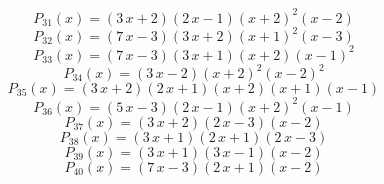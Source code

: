 \subitem \begin{dmath*}P_{31}(x) = {\left(3 \, x + 2\right)} {\left(2 \, x - 1\right)} {\left(x + 2\right)}^{2} {\left(x - 2\right)} \end{dmath*}\vspace{- 1.20000000000000 cm}
\subitem \begin{dmath*}P_{32}(x) = {\left(7 \, x - 3\right)} {\left(3 \, x + 2\right)} {\left(x + 1\right)}^{2} {\left(x - 3\right)} \end{dmath*}\vspace{- 1.20000000000000 cm}
\subitem \begin{dmath*}P_{33}(x) = {\left(7 \, x - 3\right)} {\left(3 \, x + 1\right)} {\left(x + 2\right)} {\left(x - 1\right)}^{2} \end{dmath*}\vspace{- 1.20000000000000 cm}
\subitem \begin{dmath*}P_{34}(x) = {\left(3 \, x - 2\right)} {\left(x + 2\right)}^{2} {\left(x - 2\right)}^{2} \end{dmath*}\vspace{- 1.20000000000000 cm}
\subitem \begin{dmath*}P_{35}(x) = {\left(3 \, x + 2\right)} {\left(2 \, x + 1\right)} {\left(x + 2\right)} {\left(x + 1\right)} {\left(x - 1\right)} \end{dmath*}\vspace{- 1.20000000000000 cm}
\subitem \begin{dmath*}P_{36}(x) = {\left(5 \, x - 3\right)} {\left(2 \, x - 1\right)} {\left(x + 2\right)}^{2} {\left(x - 1\right)} \end{dmath*}\vspace{- 1.20000000000000 cm}
\subitem \begin{dmath*}P_{37}(x) = {\left(3 \, x + 2\right)} {\left(2 \, x - 3\right)} {\left(x - 2\right)} \end{dmath*}\vspace{- 1.20000000000000 cm}
\subitem \begin{dmath*}P_{38}(x) = {\left(3 \, x + 1\right)} {\left(2 \, x + 1\right)} {\left(2 \, x - 3\right)} \end{dmath*}\vspace{- 1.20000000000000 cm}
\subitem \begin{dmath*}P_{39}(x) = {\left(3 \, x + 1\right)} {\left(3 \, x - 1\right)} {\left(x - 2\right)} \end{dmath*}\vspace{- 1.20000000000000 cm}
\subitem \begin{dmath*}P_{40}(x) = {\left(7 \, x - 3\right)} {\left(2 \, x + 1\right)} {\left(x - 2\right)} \end{dmath*}\vspace{- 1.20000000000000 cm}
